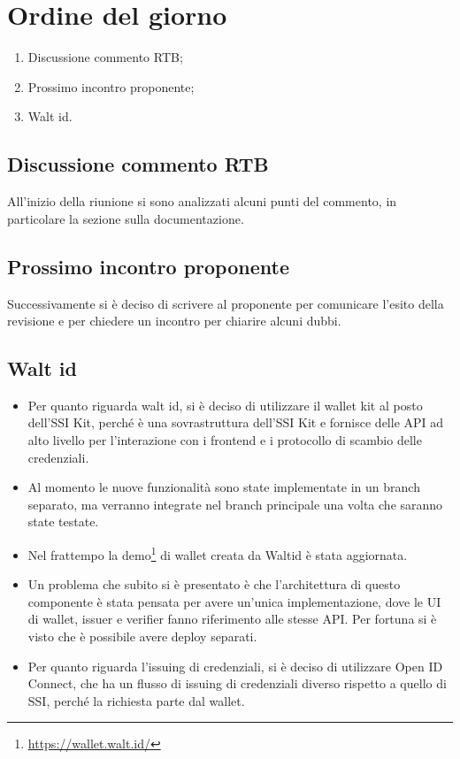 \section{Ordine del giorno}
\begin{enumerate}
\item Discussione commento RTB;
\item Prossimo incontro proponente;
\item Walt id.%
\end{enumerate}
\subsection{Discussione commento RTB}
All'inizio della riunione si sono analizzati alcuni punti del commento, in particolare la sezione sulla documentazione.
\subsection{Prossimo incontro proponente}
Successivamente si è deciso di scrivere al proponente per comunicare l'esito della revisione e per chiedere un incontro per chiarire alcuni dubbi. %
\subsection{Walt id}

\begin{itemize}
    \item Per quanto riguarda walt id, si è deciso di utilizzare il wallet kit al posto dell'SSI Kit, perché è una sovrastruttura dell'SSI Kit e fornisce delle API ad alto livello per l'interazione con i frontend e i protocollo di scambio delle credenziali.
    \item Al momento le nuove funzionalità sono state implementate in un branch separato, ma verranno integrate nel branch principale una volta che saranno state testate.
    \item Nel frattempo la demo\footnote[1]{\url{https://wallet.walt.id/}} di wallet creata da Waltid è stata aggiornata.
    \item Un problema che subito si è presentato è che l'architettura di questo componente è stata pensata per avere un'unica implementazione, dove le UI di wallet, issuer e verifier fanno riferimento alle stesse API. Per fortuna si è visto che è possibile avere deploy separati.
    \item Per quanto riguarda l'issuing di credenziali, si è deciso di utilizzare Open ID Connect, che ha un flusso di issuing di credenziali diverso rispetto a quello di SSI, perché la richiesta parte dal wallet.
\end{itemize}



